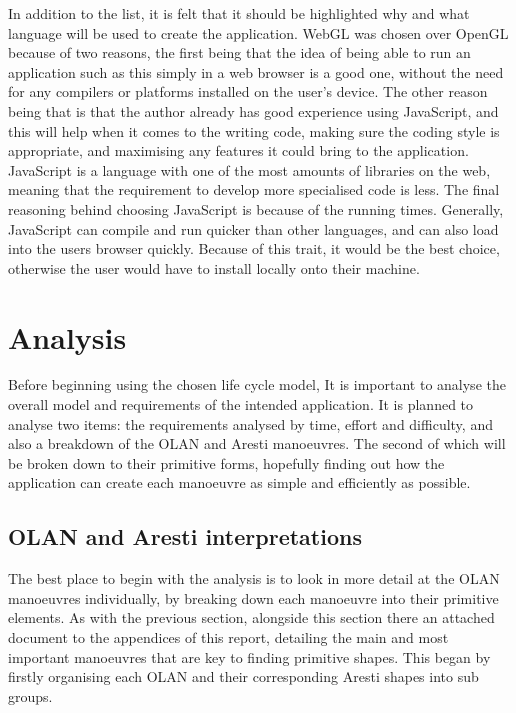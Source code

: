 In addition to the list, it is felt that it should be highlighted why and what language will be used to create the application. WebGL was chosen over OpenGL because of two reasons, the first being that the idea of being able to run an application such as this simply in a web browser is a good one, without the need for any compilers or platforms installed on the user's device. The other reason being that is that the author already has good experience using JavaScript, and this will help when it comes to the writing code, making sure the coding style is appropriate, and maximising any features it could bring to the application. JavaScript is a language with one of the most amounts of libraries on the web, meaning that the requirement to develop more specialised code is less. The final reasoning behind choosing JavaScript is because of the running times. Generally, JavaScript can compile and run quicker than other languages, and can also load into the users browser quickly. Because of this trait, it would be the best choice, otherwise the user would have to install locally onto their machine.

\section{Analysis}
Before beginning using the chosen life cycle model, It is important to analyse the overall model and requirements of the intended application. It is planned to analyse two items: the requirements analysed by time, effort and difficulty, and also a breakdown of the OLAN and Aresti manoeuvres. The second of which will be broken down to their primitive forms, hopefully finding out how the application can create each manoeuvre as simple and efficiently as possible.

\subsection{OLAN and Aresti interpretations}
The best place to begin with the analysis is to look in more detail at the OLAN manoeuvres individually, by breaking down each manoeuvre into their primitive elements. As with the previous section, alongside this section there an attached document to the appendices of this report, detailing the main and most important manoeuvres that are key to finding primitive shapes. This began by firstly organising each OLAN and their corresponding Aresti shapes into sub groups. 

